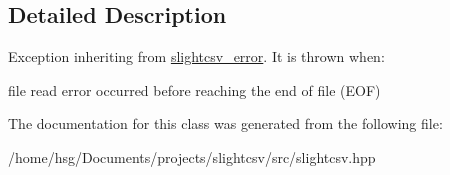 \subsection{Detailed Description}
Exception inheriting from \hyperlink{classutils_1_1slightcsv__error}{slightcsv\+\_\+error}. It is thrown when\+:
\begin{DoxyItemize}
\item file read error occurred before reaching the end of file (E\+OF) 
\end{DoxyItemize}

The documentation for this class was generated from the following file\+:\begin{DoxyCompactItemize}
\item 
/home/hsg/\+Documents/projects/slightcsv/src/slightcsv.\+hpp\end{DoxyCompactItemize}
